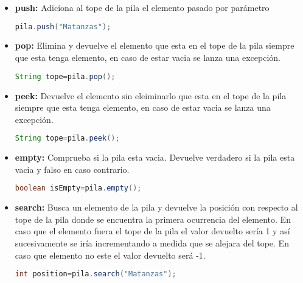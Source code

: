 \begin{itemize}
	\item {\bf push:} Adiciona al tope de la pila el elemento pasado por parámetro 
	
	\begin{lstlisting}[language=Java]
pila.push("Matanzas");
	\end{lstlisting}
	
	\item {\bf pop:} Elimina y devuelve el elemento que esta en el tope de la pila siempre que esta tenga elemento, en caso de estar vacia se lanza una excepción.
	
	\begin{lstlisting}[language=Java]
String tope=pila.pop();
	\end{lstlisting}
	
	\item {\bf peek:} Devuelve el elemento sin eleiminarlo que esta en el tope de la pila siempre que esta tenga elemento, en caso de estar vacia se lanza una excepción.
	
	\begin{lstlisting}[language=Java]
String tope=pila.peek();
	\end{lstlisting}
	
	\item {\bf empty:} Comprueba si la pila esta vacia. Devuelve verdadero si la pila esta vacia y falso en caso contrario.
	
	\begin{lstlisting}[language=Java]
boolean isEmpty=pila.empty();
	\end{lstlisting}
	
	\item {\bf search:} Busca un elemento de la pila y devuelve la posición con respecto al tope de la pila donde se encuentra la primera ocurrencia del elemento. En caso que el elemento fuera el tope de la pila el valor devuelto sería 1 y así sucesivamente se iría incrementando a medida que se alejara del tope. En caso que elemento no este el valor devuelto será -1.
	
	\begin{lstlisting}[language=Java]
int position=pila.search("Matanzas");
	\end{lstlisting}
	
\end{itemize}